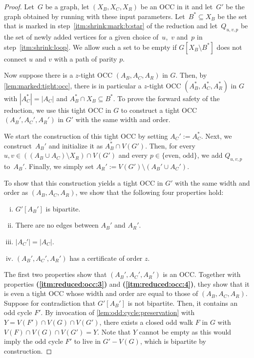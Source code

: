 \lemForwardSafety*
\begin{proof}
	Let~$G$ be a graph, let $(X_B, X_C, X_R)$ be an OCC in it and let~$G'$ be the graph obtained by running  with these input parameters. Let~$B^\ast \subseteq X_B$ be the set that is marked in step~\ref{itm:shrink:mark:b:star} of the reduction and let~$Q_{u, v, p}$ be the set of newly added vertices for a given choice of~$u$,~$v$ and~$p$ in step~\ref{itm:shrink:loop}. We allow such a set to be empty if $G[X_B \setminus B^\ast]$ does not connect $u$ and $v$ with a path of parity $p$.
	
	Now suppose there is a $z$-tight OCC $(A_B, A_C, A_R)$ in $G$. Then, by \cref{lem:marked:tight:occ}, there is in particular a $z$-tight OCC $(A_B^\ast, A_C^\ast, A_R^\ast)$ in $G$ with $|A_C^\ast| = |A_C|$ and $A_B^\ast \cap X_B \subseteq B^\ast$. To prove the forward safety of the reduction, we use this tight OCC in $G$ to construct a tight OCC $(A_B', A_C', A_R')$ in $G'$ with the same width and order.
	
	We start the construction of this tight OCC by setting $A_C' := A_C^\ast$. Next, we construct~$A_B'$ and initialize it as $A_B^\ast \cap V(G')$. Then, for every $u, v \in ((A_B \cup A_C) \setminus X_R) \cap V(G')$ and every $p \in \{\text{even, odd}\}$, we add $Q_{u,v,p}$ to~$A_B'$. Finally, we simply set $A_R' := V(G') \setminus (A_B' \cup A_C')$.
	
	To show that this construction yields a tight OCC in $G'$ with the same width and order as $(A_B, A_C, A_R)$, we show that the following four properties hold:
	\begin{enumerate} [(i)]
		\item \label{itm:reduced:occ:1} $G'[A_B']$ is bipartite.
		\item \label{itm:reduced:occ:2} There are no edges between $A_B'$ and $A_R'$.
		\item \label{itm:reduced:occ:3} $|A_C'| = |A_C|$.
		\item \label{itm:reduced:occ:4} $(A_B', A_C', A_R')$ has a certificate of order $z$.
	\end{enumerate}
	The first two properties show that $(A_B', A_C', A_R')$ is an OCC. Together with properties \textbf{(\ref{itm:reduced:occ:3})} and \textbf{(\ref{itm:reduced:occ:4})}, they show that it is even a tight OCC whose width and order are equal to those of $(A_B, A_C, A_R)$. 
	 Suppose for contradiction that $G'[A_B']$ is not bipartite. Then, it contains an odd cycle $F'$. By invocation of  \cref{lem:odd:cycle:preservation} with $Y = V(F') \cap V(G) \cap V(G')$, there exists a closed odd walk $F$ in $G$ with $V(F) \cap V(G) \cap V(G') = Y$. Note that $Y$ cannot be empty as this would imply the odd cycle $F'$ to live in $G' - V(G)$, which is bipartite by construction.
	

\end{proof}
